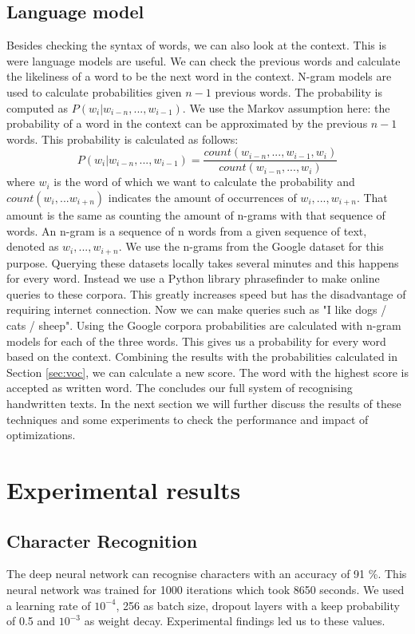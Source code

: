 \documentclass{article}
\begin{document}
\subsection{Language model}
\label{sec:lm}
Besides checking the syntax of words, we can also look at the context. This is were language models are useful. We can check the previous words and calculate the likeliness of a word to be the next word in the context. N-gram models are used to calculate probabilities given $n-1$ previous words. The probability is computed as $P(w_i | w_{i-n},...,w_{i-1})$.
We use the Markov assumption here: the probability of a word in the context can be approximated by the previous $n-1$ words. \cite{markov} This probability is calculated as follows:
\begin{equation}
        P(w_i | w_{i-n},...,w_{i-1}) = \frac{count(w_{i-n},...,w_{i-1},w_{i})}{count(w_{i-n},...,w_i)}
\end{equation}
where $w_i$ is the word of which we want to calculate the probability and $count(w_i,...w_{i+n})$ indicates the amount of occurrences of $w_i,...,w_{i+n}$. That amount is the same as counting the amount of n-grams with that sequence of words. An n-gram is a sequence of n words from a given sequence of text, denoted as $w_i,...,w_{i+n}$. \cite{ngrams}
We use the n-grams from the Google dataset for this purpose. \cite{google} Querying these datasets locally takes several minutes and this happens for every word. Instead we use a Python library phrasefinder to make online queries to these corpora. This greatly increases speed but has the disadvantage of requiring internet connection.
Now we can make queries such as "I like dogs / cats / sheep". Using the Google corpora probabilities are calculated with n-gram models for each of the three words. This gives us a probability for every word based on the context.
Combining the results with the probabilities calculated in Section \ref{sec:voc}, we can
calculate a new score. The word with the highest score is accepted as written word.
The concludes our full system of recognising handwritten texts. In the next section we will further discuss the results of these techniques and some experiments to check the performance and impact of optimizations.
\section{Experimental results}
\label{sec:expres}

\subsection{Character Recognition}
The deep neural network can recognise characters with an accuracy of 91 \%. This neural network was trained for 1000 iterations which took 8650 seconds. We used a learning rate of $10^{-4}$, 256 as batch size, dropout layers with a keep probability of 0.5 and $10^{-3}$ as weight decay. Experimental findings led us to these values.
\end{document}
